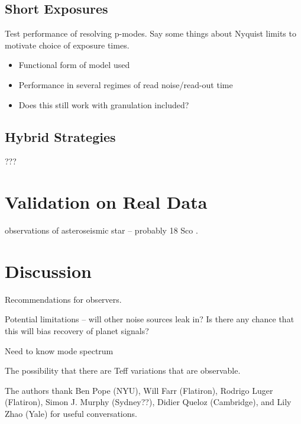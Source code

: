 \documentclass[modern]{aastex62}
\begin{document}
\subsection{Short Exposures}

Test performance of resolving p-modes. Say some things about Nyquist limits to motivate choice of exposure times.

\begin{itemize}
\item Functional form of model used
\item Performance in several regimes of read noise/read-out time
\item Does this still work with granulation included?
\end{itemize}

\subsection{Hybrid Strategies}

???

\section{Validation on Real Data}

\HARPS observations of asteroseismic star -- probably 18 Sco \citep{Bazot2012}.

\section{Discussion}

Recommendations for observers.

Potential limitations -- will other noise sources leak in? Is there any chance that this will bias recovery of planet signals?

Need to know mode spectrum

The possibility that there are Teff variations that are observable.

\acknowledgements
The authors thank
  Ben Pope (NYU),
  Will Farr (Flatiron),
  Rodrigo Luger (Flatiron),
  Simon J. Murphy (Sydney??),
  Didier Queloz (Cambridge), and
  Lily Zhao (Yale)
for useful conversations.



\clearpage


\end{document}
